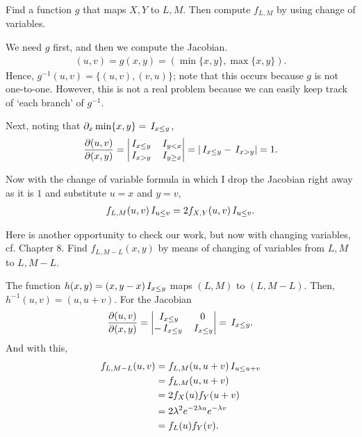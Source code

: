 \documentclass[a4paper,11pt]{article}
\begin{document}
\begin{exercise}
Find a function $g$ that maps $X,Y$ to $L,M$. Then compute $f_{L,M}$ by using change of variables.
\begin{solution}
We need $g$ first, and then we compute the Jacobian.
\begin{align}
(u,v) = g(x, y) = (\min\{x,y\}, \max\{x,y\}).
\end{align}
Hence, $g^{-1}(u,v) = \{(u,v), (v, u)\}$; note that this occurs because $g$ is not one-to-one.
However, this is not a real problem because we can easily keep track of `each branch' of $g^{-1}$.

Next, noting that $\partial_{x}\min\{x,y\} = \,I_{x\leq y}$,
\begin{align}
\frac{\partial (u,v)}{\partial(x,y)} =
  \begin{vmatrix}
    \,I_{x\leq y} & \,I_{y<x} \\
    \,I_{x > y} & \,I_{y \geq x} \\
  \end{vmatrix} = |\,I_{x\leq y} - \,I_{x>y}| = 1.
\end{align}

Now with the change of variable formula in which I drop the Jacobian right away as it is $1$ and substitute $u=x$ and $y=v$,
\begin{align}
  \label{eq:30}
f_{L,M}(u,v)\,I_{u\leq v} = 2f_{X,Y}(u,v)\,I_{u\leq v}.
\end{align}
\end{solution}
\end{exercise}



\begin{exercise}
Here is another opportunity to check our work, but now with changing variables, cf. Chapter 8.
Find $f_{L,M-L}(x,y)$ by means of changing of variables from $L,M$ to $L,M-L$.
\begin{solution}
  The function $h(x,y)= (x, y-x)\,I_{x\leq y}$ maps $(L,M)$ to $(L, M-L)$. Then, $h^{-1}(u,v) = (u, u+v)$. For the Jacobian
  \begin{align}
    \label{eq:57}
\frac{\partial (u,v)}{\partial(x,y)} =
    \begin{vmatrix}
      \,I_{x\leq y} & 0 \\
-\,I_{x\leq y} & \,I_{x\leq y}
    \end{vmatrix} = \,I_{x\leq y}.
  \end{align}
And with this,
\begin{align}
  \label{eq:19}
f_{L, M-L}(u,v)
&= f_{L, M}(u, u+v) \,I_{u\leq u+v}  \\
&= f_{L,M}(u, u+v) \\
&= 2 f_{X}(u) f_Y(u+v) \\
&= 2 \lambda^{2}e^{-2\lambda u} e^{-\lambda v} \\
&= f_{L}(u) f_Y(v).
\end{align}

\end{solution}
\end{exercise}
\end{document}
